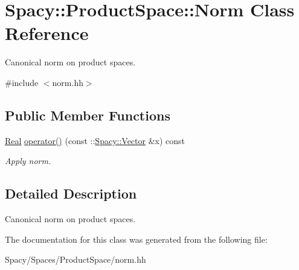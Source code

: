\hypertarget{classSpacy_1_1ProductSpace_1_1Norm}{}\section{Spacy\+:\+:Product\+Space\+:\+:Norm Class Reference}
\label{classSpacy_1_1ProductSpace_1_1Norm}


Canonical norm on product spaces.  




{\ttfamily \#include $<$norm.\+hh$>$}

\subsection*{Public Member Functions}
\begin{DoxyCompactItemize}
\item 
\hypertarget{classSpacy_1_1ProductSpace_1_1Norm_a2c5b998ea93fdfb5e3c0df5f436bbe05}{}\hyperlink{classSpacy_1_1Real}{Real} \hyperlink{classSpacy_1_1ProductSpace_1_1Norm_a2c5b998ea93fdfb5e3c0df5f436bbe05}{operator()} (const \+::\hyperlink{classSpacy_1_1Vector}{Spacy\+::\+Vector} \&x) const \label{classSpacy_1_1ProductSpace_1_1Norm_a2c5b998ea93fdfb5e3c0df5f436bbe05}

\begin{DoxyCompactList}\small\item\em Apply norm. \end{DoxyCompactList}\end{DoxyCompactItemize}


\subsection{Detailed Description}
Canonical norm on product spaces. 

The documentation for this class was generated from the following file\+:\begin{DoxyCompactItemize}
\item 
Spacy/\+Spaces/\+Product\+Space/norm.\+hh\end{DoxyCompactItemize}
